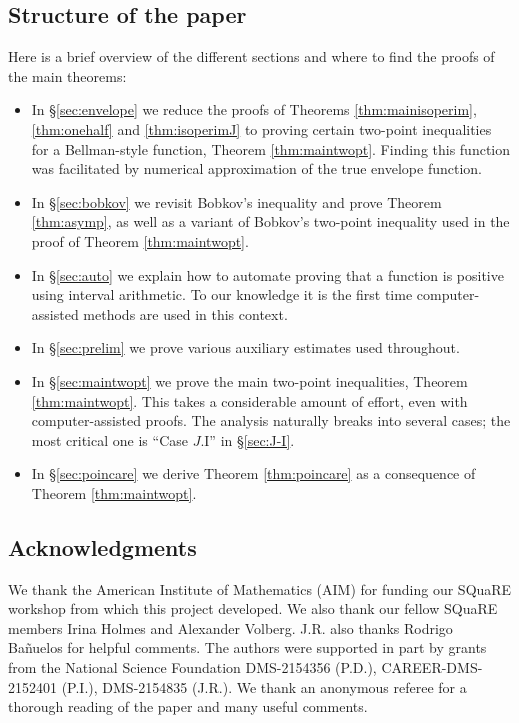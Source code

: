 \documentclass[12pt]{amsart}
\theoremstyle{plain}
\theoremstyle{definition}
\theoremstyle{remark}
\numberwithin{equation}{section}
\begin{document}
\subsection*{Structure of the paper} Here is a brief overview of the different sections and where to find the proofs of the main theorems:
\begin{itemize}
\item[--] In \S \ref{sec:envelope} we reduce the proofs of Theorems \ref{thm:mainisoperim}, \ref{thm:onehalf} and \ref{thm:isoperimJ} to proving certain two-point inequalities for a Bellman-style function, Theorem \ref{thm:maintwopt}. Finding this function was facilitated by numerical approximation of the true envelope function. 
\item[--] In \S \ref{sec:bobkov} we revisit Bobkov's inequality and prove Theorem \ref{thm:asymp}, as well as a variant of Bobkov's two-point inequality used in the proof of Theorem \ref{thm:maintwopt}.
\item[--] In \S \ref{sec:auto} we explain how to automate proving that a function is positive using interval arithmetic. 
To our knowledge it is the first time computer-assisted methods are used in this context.
\item[--] In \S \ref{sec:prelim} we prove various auxiliary estimates used throughout.
\item[--] In \S \ref{sec:maintwopt} we prove the main two-point inequalities, Theorem \ref{thm:maintwopt}. This takes a considerable amount of effort, even with computer-assisted proofs. 
The analysis naturally breaks into several cases; the most critical one is ``Case $J$.I'' in \S \ref{sec:J-I}.
\item[--] In \S \ref{sec:poincare} we derive Theorem \ref{thm:poincare} as a consequence of Theorem \ref{thm:maintwopt}.
\end{itemize}

\subsection*{Acknowledgments} We thank the American Institute of Mathematics (AIM) for funding our SQuaRE workshop from which this project developed. We also thank our fellow SQuaRE members Irina Holmes and Alexander Volberg. J.R. also thanks Rodrigo Ba\~{n}uelos for helpful comments. The authors were  supported in part by grants from the National Science Foundation DMS-2154356 (P.D.), CAREER-DMS-2152401 (P.I.), DMS-2154835 (J.R.). 
We thank an anonymous referee for a thorough reading of the paper and many useful comments.
\end{document}
